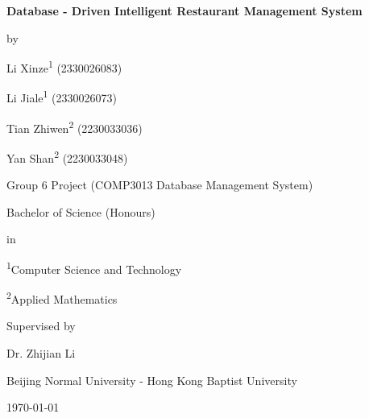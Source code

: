 \documentclass[12pt]{article}
\begin{document}
\lstset{
    basicstyle=\ttfamily, %
    breaklines=true,            %
    columns=flexible            %
}


\begin{titlepage}
    \centering
    \vspace{0.5cm}
    {\LARGE\bfseries Database - Driven Intelligent Restaurant Management System\par}
    \vspace{0.5cm}
    {\large by \par}
    \vspace{2cm}
    {\large Li Xinze\textsuperscript{1} (2330026083) \par}  
    {\large Li Jiale\textsuperscript{1} (2330026073) \par}  
    {\large Tian Zhiwen\textsuperscript{2} (2230033036)\par}  %
    {\large Yan Shan\textsuperscript{2} (2230033048) \par}    %
    \vspace{1.5cm}
    {\large Group 6 Project (COMP3013 Database Management System) \par}
    \vspace{1.5cm}
    {\large Bachelor of Science (Honours) \par}
    \vspace{0.3cm}
    {\large in \par}
    \vspace{0.3cm}
    {\large \textsuperscript{1}Computer Science and Technology\par} 
    {\large \textsuperscript{2}Applied Mathematics \par}      %
    \vspace{1.5cm}
    {\large Supervised by\par}
    {\large Dr. Zhijian Li\par}
    \vspace{1cm}
    {\large Beijing Normal University - Hong Kong Baptist University\par}
    {\large \today\par}
\end{titlepage}





\newpage
\tableofcontents

\thispagestyle{empty} 

\newpage

\setcounter{page}{1}
\end{document}
